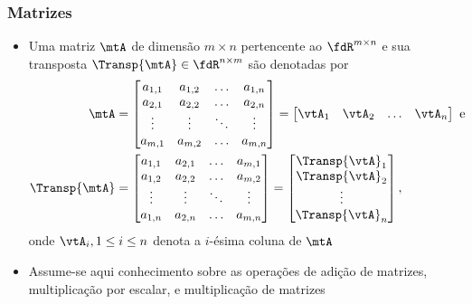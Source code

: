 \begin{frame}
  \frametitle{Matrizes}
  \begin{itemize}
    \item Uma matriz $\mtA$ de dimensão $m \times n$ pertencente ao $\fdR^{m \times n}$ e sua transposta $\Transp{\mtA} \in \fdR^{n \times m}$ são denotadas por
    \begin{equation}\label{eq_mat_transp}
      \begin{split}
        \mtA &= \left[\begin{matrix}
          a_{1,1} & a_{1,2} & \ldots & a_{1,n} \\
          a_{2,1} & a_{2,2} & \ldots & a_{2,n} \\
          \vdots & \vdots & \ddots & \vdots \\
          a_{m,1} & a_{m,2} & \ldots & a_{m,n}
        \end{matrix}\right] = \left[\begin{matrix} \vtA_1 & \vtA_2 & \ldots & \vtA_n\end{matrix}\right] \text{ e } \\
        \Transp{\mtA} &= \left[\begin{matrix}
          a_{1,1} & a_{2,1} & \ldots & a_{m,1} \\
          a_{1,2} & a_{2,2} & \ldots & a_{m,2} \\
          \vdots & \vdots & \ddots & \vdots \\
          a_{1,n} & a_{2,n} & \ldots & a_{m,n}
        \end{matrix}\right] = \left[\begin{matrix} \Transp{\vtA}_1 \\ \Transp{\vtA}_2 \\ \vdots \\ \Transp{\vtA}_n\end{matrix}\right],
      \end{split}
    \end{equation}
    onde $\vtA_i, 1 \leq i \leq n$ denota a $i$-ésima coluna de $\mtA$
    \item Assume-se aqui conhecimento sobre as operações de adição de matrizes, multiplicação por escalar, e multiplicação de matrizes
  \end{itemize}
\end{frame}

